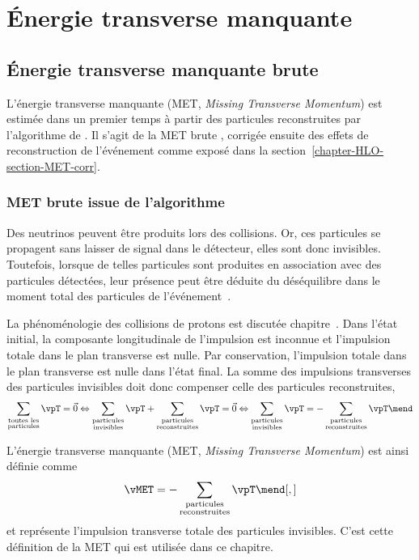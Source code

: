 \section{Énergie transverse manquante}\label{chapter-HLO-section-MET}
\subsection{Énergie transverse manquante brute}\label{chapter-HLO-section-MET-raw}
L'énergie transverse manquante (MET, \emph{Missing Transverse Momentum}) est estimée dans un premier temps à partir des particules reconstruites par l'algorithme de \PF.
Il s'agit de la MET \og brute \fg, corrigée ensuite des effets de reconstruction de l'événement comme exposé dans la section~\ref{chapter-HLO-section-MET-corr}.
\subsubsection{MET brute issue de l'algorithme \PF}
Des neutrinos peuvent être produits lors des collisions.
Or, ces particules se propagent sans laisser de signal dans le détecteur, elles sont donc invisibles.
Toutefois, lorsque de telles particules sont produites en association avec des particules détectées, leur présence peut être déduite du déséquilibre dans le moment total des particules de l'événement~\cite{CMS-PAS-JME-17-001}.
\par
La phénoménologie des collisions de protons est discutée chapitre~.
Dans l'état initial,
la composante longitudinale de l'impulsion est inconnue
et
l'impulsion totale dans le plan transverse est nulle.
Par conservation, l'impulsion totale dans le plan transverse est nulle dans l'état final.
La somme des impulsions transverses des particules invisibles doit donc compenser celle des particules reconstruites, \ie
\begin{equation}
\sum_{\substack{\text{toutes les}\\\text{particules}}} \vpT = \vec{0}
\Leftrightarrow
\sum_{\substack{\text{particules}\\\text{invisibles}}} \vpT + \sum_{\substack{\text{particules}\\\text{reconstruites}}} \vpT = \vec{0}
\Leftrightarrow
\sum_{\substack{\text{particules}\\\text{invisibles}}} \vpT = -\sum_{\substack{\text{particules}\\\text{reconstruites}}} \vpT \mend
\end{equation}
\par L'énergie transverse manquante (MET, \emph{Missing Transverse Momentum}) est ainsi définie comme
\begin{equation}
\vMET = -\sum_{\substack{\text{particules}\\\text{reconstruites}}} \vpT
\mend[,]
\end{equation}
et représente l'impulsion transverse totale des particules invisibles.
C'est cette définition de la MET qui est utilisée dans ce chapitre.
